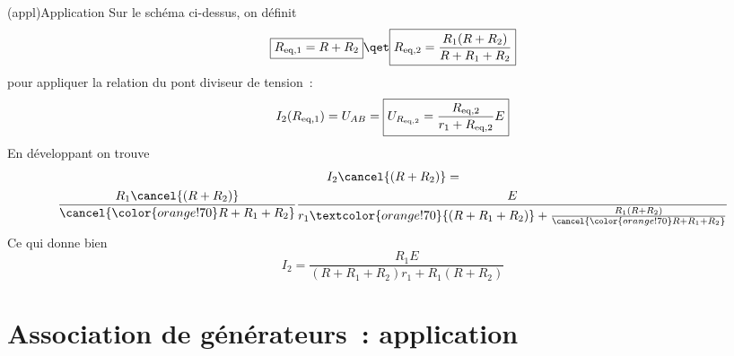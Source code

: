 \documentclass[../../main/main.tex]{subfiles}
\begin{document}
{\begin{tcbraster}[raster columns=2, raster equal height=rows]
\begin{tcb}[sidebyside, righthand ratio=.4]
\begin{center}
        \end{center}
    \end{tcb}
\end{tcbraster}
\begin{tcb}(appl){Application}
    Sur le schéma ci-dessus, on définit
    \[ \boxed{R_{\rm eq,1} = R+R_2} \qet \boxed{R_{\rm eq,2} =
        \frac{R_1(R+R_2)}{R + R_1 + R_2}}\]
    pour appliquer la relation du pont diviseur de tension~:
    \begin{equation*}
        I_2(R_{\rm eq,1}) = U_{AB} =
            \boxed{U_{R_{\rm eq,2}} = \frac{R_{\rm eq,2}}{r_1 + R_{\rm eq,2}}E}
    \end{equation*}
    \tcblower
    En développant on trouve
    \begin{gather*}
        I_2\cancel{(R+R_2)} =\\
            \frac{R_1\cancel{(R+R_2)}}{\cancel{\color{orange!70}R + R_1 + R_2}}
            \frac{E}{r_1 \textcolor{orange!70}{(R+R_1+R_2)}
                    + \frac{R_1(R+R_2)}{\cancel{\color{orange!70}R + R_1 +
                R_2}}}
    \end{gather*}
    Ce qui donne bien
    \begin{equation*}
        \boxed{I_2 = \frac{R_1E}{(R+R_1+R_2)r_1 + R_1(R+R_2)}}
    \end{equation*}
\end{tcb}
}

\section{Association de générateurs~: application}
\end{document}
